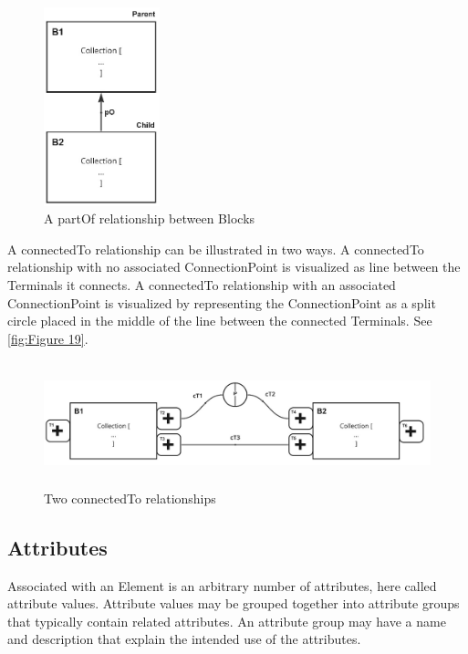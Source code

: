 \begin{figure}[htb]
  \centering
  \includegraphics[width=1.3221in,height=2.26735in]{img/ontology/element-partOf.jpg}
  \caption{A partOf relationship between Blocks }
  \label{fig:Figure 18}
\end{figure}

A connectedTo relationship can be illustrated in two ways. A connectedTo relationship with no
associated ConnectionPoint is visualized as line between the Terminals it connects. A connectedTo relationship with
an associated ConnectionPoint is visualized by representing the ConnectionPoint as a split circle placed in the
middle of the line between the connected Terminals. See \autoref{fig:Figure 19}.

\begin{figure}[htb]
  \centering
  \includegraphics[width=6.5in,height=1.425in]{img/ontology/element-connectedTo.jpg}
  \caption{Two connectedTo relationships}
  \label{fig:Figure 19}
\end{figure}

\subsection{Attributes}
Associated with an Element is an arbitrary number of attributes, here called attribute
values. Attribute values may be grouped together into attribute groups that typically contain related attributes. An
attribute group may have a name and description that explain the intended use of the attributes.

